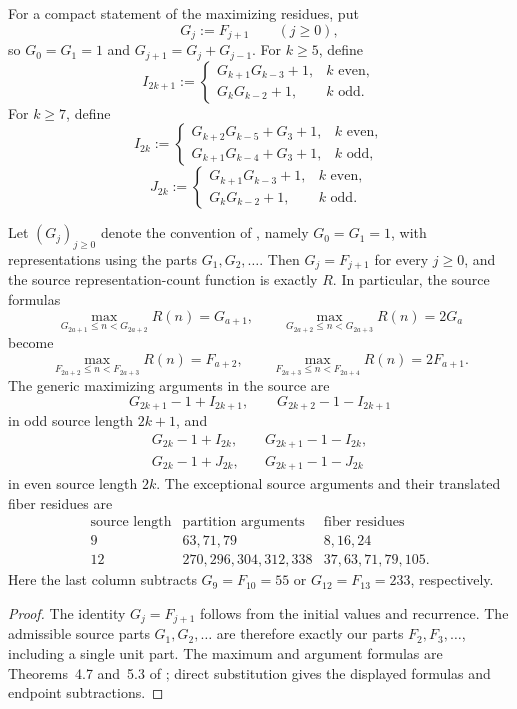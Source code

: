 For a compact statement of the maximizing residues, put
\[
 G_j:=F_{j+1}\qquad(j\ge0),
\]
so \(G_0=G_1=1\) and \(G_{j+1}=G_j+G_{j-1}\).
For \(k\ge5\), define
\[
 I_{2k+1}:=
 \begin{cases}
 G_{k+1}G_{k-3}+1,&k\text{ even},\\
 G_kG_{k-2}+1,&k\text{ odd}.
 \end{cases}
\]
For \(k\ge7\), define
\[
 I_{2k}:=
\begin{cases}
 G_{k+2}G_{k-5}+G_3+1,&k\text{ even},\\
 G_{k+1}G_{k-4}+G_3+1,&k\text{ odd},
 \end{cases}
\]
\[
 J_{2k}:=
 \begin{cases}
 G_{k+1}G_{k-3}+1,&k\text{ even},\\
 G_kG_{k-2}+1,&k\text{ odd}.
 \end{cases}
\]

\begin{conventionlemma}
Let \((G_j)_{j\ge0}\) denote the convention of
\cite{KocabovaMasakovaPelantova2005}, namely \(G_0=G_1=1\), with
representations using the parts \(G_1,G_2,\ldots\).  Then
\(G_j=F_{j+1}\) for every \(j\ge0\), and the source representation-count
function is exactly \(R\).  In particular, the source formulas
\[
 \max_{G_{2a+1}\le n<G_{2a+2}}R(n)=G_{a+1},\qquad
 \max_{G_{2a+2}\le n<G_{2a+3}}R(n)=2G_a
\]
become
\[
 \max_{F_{2a+2}\le n<F_{2a+3}}R(n)=F_{a+2},\qquad
 \max_{F_{2a+3}\le n<F_{2a+4}}R(n)=2F_{a+1}.
\]
The generic maximizing arguments in the source are
\[
 G_{2k+1}-1+I_{2k+1},\qquad G_{2k+2}-1-I_{2k+1}
\]
in odd source length \(2k+1\), and
\[
 \begin{split}
 G_{2k}-1+I_{2k},&\quad G_{2k+1}-1-I_{2k},\\
 G_{2k}-1+J_{2k},&\quad G_{2k+1}-1-J_{2k}
 \end{split}
\]
in even source length \(2k\).  The exceptional source arguments and their
translated fiber residues are
\[
 \begin{array}{c|c|c}
 \text{source length}&\text{partition arguments}&\text{fiber residues}\\ \hline
 9&63,71,79&8,16,24\\
 12&270,296,304,312,338&37,63,71,79,105.
 \end{array}
\]
Here the last column subtracts \(G_9=F_{10}=55\) or
\(G_{12}=F_{13}=233\), respectively.
\end{conventionlemma}

\begin{proof}
The identity \(G_j=F_{j+1}\) follows from the initial values and recurrence.
The admissible source parts \(G_1,G_2,\ldots\) are therefore exactly our
parts \(F_2,F_3,\ldots\), including a single unit part.  The maximum and
argument formulas are Theorems~4.7 and~5.3 of
\cite{KocabovaMasakovaPelantova2005}; direct substitution gives the displayed
formulas and endpoint subtractions.
\end{proof}

